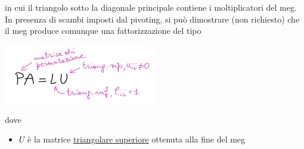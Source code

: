 \documentclass[12pt,a4paper]{article}
\begin{document}
in cui il triangolo sotto la diagonale principale contiene i moltiplicatori del meg.\\
In presenza di scambi imposti dal pivoting, si può dimostrare (non richiesto) che il meg produce comunque una fattorizzazione del tipo
\begin{center}
    \includegraphics[width = 0.5\textwidth]{pag17.jpg}
\end{center}
dove
\begin{itemize}
    \item $U$ è la matrice \underline{triangolare superiore} ottenuta alla fine del meg
    

\end{itemize}
\end{document}
